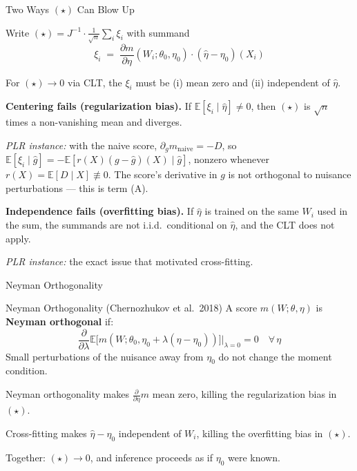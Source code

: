 \documentclass[aspectratio=169, 11pt, handout]{beamer}
\newcommand{\E}{\mathbb{E}}
\begin{document}
\begin{frame}{Two Ways $(\star)$ Can Blow Up}

Write $(\star) = J^{-1} \cdot \frac{1}{\sqrt n}\sum_i \xi_i$ with summand
\[
\xi_i \;=\; \frac{\partial m}{\partial \eta}(W_i; \theta_0, \eta_0) \cdot (\hat\eta - \eta_0)(X_i)
\]

For $(\star) \to 0$ via CLT, the $\xi_i$ must be (i) mean zero and (ii) independent of $\hat\eta$.

\pause
\bigskip

\textbf{Centering fails (regularization bias).} If $\E[\xi_i \mid \hat\eta] \neq 0$, then $(\star)$ is $\sqrt n$ times a non-vanishing mean and diverges.

\emph{PLR instance:} with the naive score, $\partial_g m_{\text{naive}} = -D$, so $\E[\xi_i \mid \hat g] = -\E[r(X)(g - \hat g)(X) \mid \hat g]$, nonzero whenever $r(X) = \E[D \mid X] \not\equiv 0$. The score's derivative in $g$ is not orthogonal to nuisance perturbations — this is term (A).

\pause
\bigskip

\textbf{Independence fails (overfitting bias).} If $\hat\eta$ is trained on the same $W_i$ used in the sum, the summands are not i.i.d.\ conditional on $\hat\eta$, and the CLT does not apply.

\emph{PLR instance:} the exact issue that motivated cross-fitting.

\end{frame}

\begin{frame}{Neyman Orthogonality}

\begin{block}{Neyman Orthogonality (Chernozhukov et al.\ 2018)}
A score $m(W; \theta, \eta)$ is \textbf{Neyman orthogonal} if:
\[
\frac{\partial}{\partial \lambda} \E\bigl[m(W; \theta_0, \eta_0 + \lambda(\eta - \eta_0))\bigr] \Big|_{\lambda=0} = 0 \quad \forall\, \eta
\]
Small perturbations of the nuisance away from $\eta_0$ do not change the moment condition.
\end{block}

\bigskip
\pause

Neyman orthogonality makes $\frac{\partial}{\partial\eta}m$ mean zero, killing the regularization bias in $(\star)$.

\bigskip

Cross-fitting makes $\hat{\eta} - \eta_0$ independent of $W_i$, killing the overfitting bias in $(\star)$.

\bigskip

Together: $(\star) \to 0$, and inference proceeds as if $\eta_0$ were known.

\end{frame}
\end{document}
